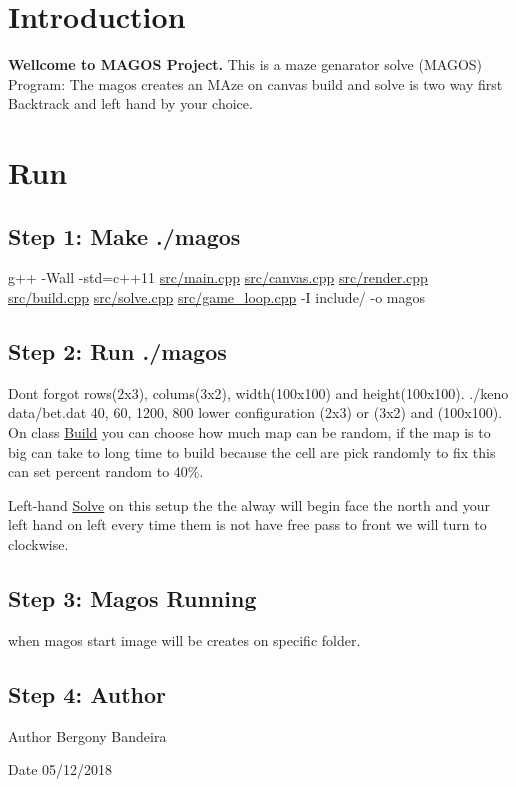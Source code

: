 \hypertarget{index_intro_sec}{}\section{Introduction}\label{index_intro_sec}
{\bfseries Wellcome to M\+A\+G\+OS Project.} This is a maze genarator solve (M\+A\+G\+OS) Program\+: The magos creates an M\+Aze on canvas build and solve is two way first Backtrack and left hand by your choice.\hypertarget{index_install_sec}{}\section{Run}\label{index_install_sec}
\hypertarget{index_step1}{}\subsection{Step 1\+: Make ./magos}\label{index_step1}
g++ -\/\+Wall -\/std=c++11 \hyperlink{main_8cpp}{src/main.\+cpp} \hyperlink{canvas_8cpp}{src/canvas.\+cpp} \hyperlink{render_8cpp}{src/render.\+cpp} \hyperlink{build_8cpp}{src/build.\+cpp} \hyperlink{solve_8cpp}{src/solve.\+cpp} \hyperlink{game__loop_8cpp}{src/game\+\_\+loop.\+cpp} -\/I include/ -\/o magos\hypertarget{index_step2}{}\subsection{Step 2\+: Run ./magos}\label{index_step2}
Dont forgot rows(2x3), colums(3x2), width(100x100) and height(100x100). ./keno data/bet.\+dat 40, 60, 1200, 800 lower configuration (2x3) or (3x2) and (100x100). On class \hyperlink{classBuild}{Build} you can choose how much map can be random, if the map is to big can take to long time to build because the cell are pick randomly to fix this can set percent random to 40\%.

Left-\/hand \hyperlink{classSolve}{Solve} on this setup the the alway will begin face the north and your left hand on left every time them is not have free pass to front we will turn to clockwise.\hypertarget{index_step3}{}\subsection{Step 3\+: Magos Running}\label{index_step3}
when magos start image will be creates on specific folder.\hypertarget{index_step4}{}\subsection{Step 4\+: Author}\label{index_step4}
\begin{DoxyAuthor}{Author}
Bergony Bandeira
\end{DoxyAuthor}
\begin{DoxyDate}{Date}
05/12/2018 
\end{DoxyDate}
